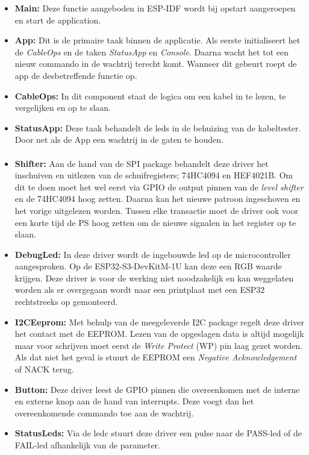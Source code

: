 \begin{itemize}[]
    \item \textbf{Main:} Deze functie aangeboden in \gls{ESP-IDF} wordt bij opstart aangeroepen en start de application.
    \item \textbf{App:} Dit is de primaire taak binnen de applicatie. Als eerste initialiseert het de \textit{CableOps} en de taken \textit{StatusApp} en \textit{Console}. Daarna wacht het tot een nieuw commando in de wachtrij terecht komt. Wanneer dit gebeurt roept de app de desbetreffende functie op.
    \item \textbf{CableOps:} In dit component staat de logica om een kabel in te lezen, te vergelijken en op te slaan.
    \item \textbf{StatusApp:} Deze taak behandelt de leds in de behuizing van de kabeltester. Door net als de App een wachtrij in de gaten te houden.
\end{itemize}

\paragraph{}

\begin{itemize}[]
    \item \textbf{Shifter:} Aan de hand van de \gls{SPI} package behandelt deze driver het inschuiven en uitlezen van de schuifregisters; 74HC4094 en HEF4021B. Om dit te doen moet het wel eerst via \gls{GPIO} de output pinnen van de \textit{level shifter} en de 74HC4094 hoog zetten. Daarna kan het nieuwe patroon ingeschoven en het vorige uitgelezen worden. Tussen elke transactie moet de driver ook voor een korte tijd de \gls{PS} hoog zetten om de nieuwe signalen in het register op te slaan.
    \item \textbf{DebugLed:} In deze driver wordt de ingebouwde led op de microcontroller aangesproken. Op de ESP32-S3-DevKitM-1U kan deze een RGB waarde krijgen. Deze driver is voor de werking niet noodzakelijk en kan weggelaten worden als er overgegaan wordt naar een printplaat met een ESP32 rechtstreeks op gemonteerd.
    \item \textbf{I2CEeprom:} Met behulp van de meegeleverde \gls{I2C} package regelt deze driver het contact met de \gls{EEPROM}. Lezen van de opgeslagen data is altijd mogelijk maar voor schrijven moet eerst de \textit{Write Protect} (WP) pin laag gezet worden. Als dat niet het geval is stuurt de \gls{EEPROM} een \textit{Negative Acknowledgement} of NACK terug.
    \item \textbf{Button:} Deze driver leest de \gls{GPIO} pinnen die overeenkomen met de interne en externe knop aan de hand van interrupts. Deze voegt dan het overeenkomende commando toe aan de wachtrij.
    \item \textbf{StatusLeds:} Via de ledc stuurt deze driver een pulse naar de PASS-led of de FAIL-led afhankelijk van de parameter.
\end{itemize}

